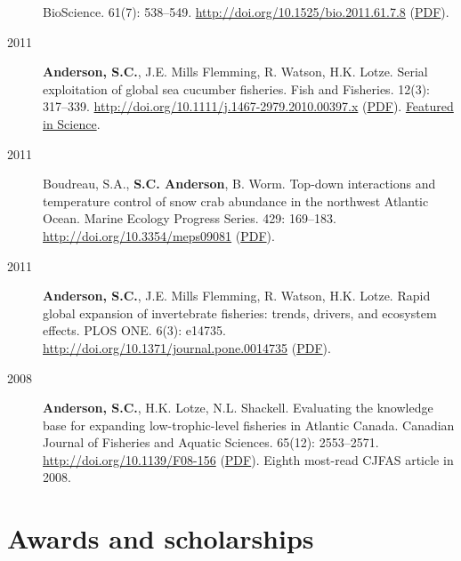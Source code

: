 \begin{description}
BioScience. 61(7): 538--549.
\url{http://doi.org/10.1525/bio.2011.61.7.8}
(\href{https://dl.dropboxusercontent.com/u/254940/papers/Anderson_etal_2011_BioScience_with_supplement.pdf}{PDF}).
\item[2011]
\textbf{Anderson, S.C.}, J.E. Mills Flemming, R. Watson, H.K. Lotze.
Serial exploitation of global sea cucumber fisheries. Fish and
Fisheries. 12(3): 317--339.
\url{http://doi.org/10.1111/j.1467-2979.2010.00397.x}
(\href{https://dl.dropboxusercontent.com/u/254940/papers/Anderson_etal_2011_seacucumbers_with_supplement.pdf}{PDF}).
\href{http://www.sciencemag.org/content/331/6014/129.1.full}{Featured in
Science}.
\item[2011]
Boudreau, S.A., \textbf{S.C. Anderson}, B. Worm. Top-down interactions
and temperature control of snow crab abundance in the northwest Atlantic
Ocean. Marine Ecology Progress Series. 429: 169--183.
\url{http://doi.org/10.3354/meps09081}
(\href{http://www.int-res.com/articles/meps_oa/m429p169.pdf}{PDF}).
\item[2011]
\textbf{Anderson, S.C.}, J.E. Mills Flemming, R. Watson, H.K. Lotze.
Rapid global expansion of invertebrate fisheries: trends, drivers, and
ecosystem effects. PLOS ONE. 6(3): e14735.
\url{http://doi.org/10.1371/journal.pone.0014735}
(\href{http://www.plosone.org/article/fetchObject.action?uri=info\%3Adoi\%2F10.1371\%2Fjournal.pone.0014735\&representation=PDF}{PDF}).
\item[2008]
\textbf{Anderson, S.C.}, H.K. Lotze, N.L. Shackell. Evaluating the
knowledge base for expanding low-trophic-level fisheries in Atlantic
Canada. Canadian Journal of Fisheries and Aquatic Sciences. 65(12):
2553--2571. \url{http://doi.org/10.1139/F08-156}
(\href{https://dl.dropboxusercontent.com/u/254940/papers/Anderson_etal_2008_knowledge.pdf}{PDF}).
Eighth most-read CJFAS article in 2008.
\end{description}

\section{Awards and scholarships}\label{awards-and-scholarships}

